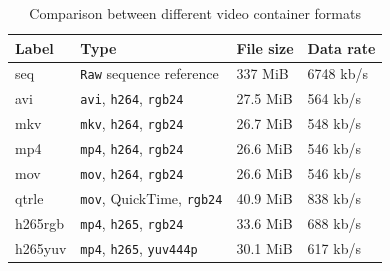 \begin{table}[t]
  \centering
  \begin{tabular}{l|l|l|l}
    \hline
    \textbf{Label} & \textbf{Type} & \textbf{File size} & \textbf{Data rate} \\ \hline
    \hline
    seq & \texttt{Raw} sequence reference                   & 337 MiB   & 6748 kb/s \\ \hline
    avi & \texttt{avi}, \texttt{h264}, \texttt{rgb24}       & 27.5 MiB  & 564 kb/s  \\ \hline
    mkv & \texttt{mkv}, \texttt{h264}, \texttt{rgb24}       & 26.7 MiB  & 548 kb/s  \\ \hline
    mp4 & \texttt{mp4}, \texttt{h264}, \texttt{rgb24}       & 26.6 MiB  & 546 kb/s  \\ \hline
    mov & \texttt{mov}, \texttt{h264}, \texttt{rgb24}       & 26.6 MiB  & 546 kb/s  \\ \hline
    qtrle & \texttt{mov}, QuickTime, \texttt{rgb24}         & 40.9 MiB  & 838 kb/s  \\ \hline
    h265rgb & \texttt{mp4}, \texttt{h265}, \texttt{rgb24}   & 33.6 MiB  & 688 kb/s  \\ \hline
    h265yuv & \texttt{mp4}, \texttt{h265}, \texttt{yuv444p} & 30.1 MiB  & 617 kb/s  \\ \hline
  \end{tabular}
  \caption{\footnotesize Comparison between different video container formats}
  \label{tbl:fmts}
\end{table}

